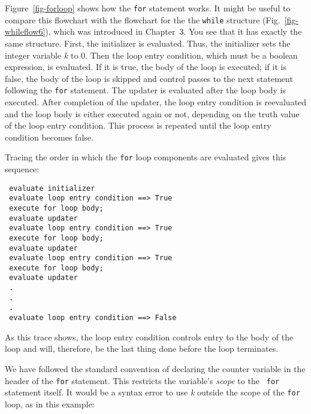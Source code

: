 Figure~\ref{fig-forloop} shows how the {\tt for} statement works.  It
might be useful to compare this flowchart with the flowchart for the the
{\tt while} structure (Fig.~\ref{fig-whileflow6}), which was
introduced in Chapter~3.  You see that it has exactly the same
structure.  First, the initializer is evaluated.  Thus, the initializer
sets the integer variable {\it k} to 0.  Then the loop entry
condition, which must be a boolean expression, is evaluated.  If it is
true, the body of the loop is executed; if it is false, the body of
the loop is skipped and control passes to the next statement following
the {\tt for} statement.  The updater is evaluated after the loop body is
executed.  After completion of the updater, the loop entry condition
is reevaluated and the loop body is either executed again or not,
depending on the truth value of the loop entry condition.  This
process is repeated until the loop entry condition becomes false.

\begin{figure}[h!]
\end{figure}

Tracing the order in which the {\tt for} loop components are
evaluated gives this sequence:

\begin{jjjlisting}
\begin{lstlisting}
 evaluate initializer
 evaluate loop entry condition ==> True
 execute for loop body;
 evaluate updater
 evaluate loop entry condition ==> True
 execute for loop body;
 evaluate updater
 evaluate loop entry condition ==> True
 execute for loop body;
 evaluate updater
 .
 .
 .
 evaluate loop entry condition ==> False
\end{lstlisting}
\end{jjjlisting}

\noindent As this trace shows, the loop entry condition controls
entry to the body of the loop and will, therefore, be the last thing
done before the loop terminates.

We have followed the standard convention of declaring the counter
variable in the header of the {\tt for} statement.  This restricts the
 variable's {\it scope} to the {\tt
for} statement itself.  It would be a syntax error to use {\it k}
outside the scope of the {\tt for} loop, as in this example:


